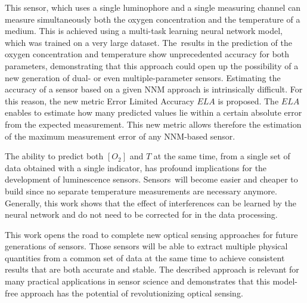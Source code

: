 \documentclass[sensors,article,accept,moreauthors,pdftex,10pt,a4paper]{Definitions/mdpi}
\theoremstyle{definition}
\begin{document}
This sensor, which uses a single luminophore and a single measuring channel can measure simultaneously both the oxygen concentration and the temperature of a medium. This is achieved using a multi-task learning neural network model, which was trained on a very large dataset. The~results in the prediction of the oxygen concentration and temperature show unprecedented accuracy for both parameters, demonstrating that this approach could open up the possibility of a new generation of dual- or even multiple-parameter sensors.
Estimating the accuracy of a sensor based on a given NNM approach is intrinsically difficult. For this reason, the new metric Error Limited Accuracy $ELA$ is proposed. The $ELA$ enables to estimate how many predicted values lie within a certain absolute error from the expected measurement. This new metric allows therefore the estimation of the maximum measurement error of any NNM-based sensor.

The ability to predict both $[O_2]$ and $T$ at the same time, from a single set of data obtained with a single indicator, has profound implications for the development of luminescence sensors. Sensors~will become easier and cheaper to build since no separate temperature measurements are necessary anymore. Generally, this work shows that the effect of interferences can be learned by the neural network and do not need to be corrected for in the data processing. 

This work opens the road to complete new optical sensing approaches for future generations of sensors. Those sensors will be able to extract multiple physical quantities from a common set of data at the same time to achieve consistent results that are both accurate and stable. The described approach is relevant for many practical applications in sensor science and demonstrates that this model-free approach has the potential of revolutionizing optical sensing.




\vspace{6pt} 


\end{document}

